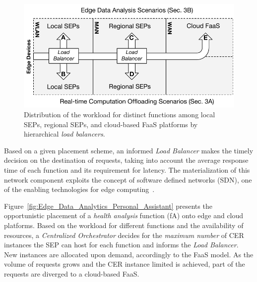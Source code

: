 
\begin{figure}[b]
	\centering
	\includegraphics[width=1\linewidth]{Figs/Edge_Load_Placement}
	\caption{Distribution of the workload for distinct functions among local SEPs, regional SEPs, and cloud-based FaaS platforms by hierarchical \textit{load balancers}.}
	\label{fig:Edge_Load_Placement}
\end{figure}


Based on a given placement scheme, an informed \textit{Load Balancer} makes the timely decision on the destination of requests, taking into account the average response time of each function and its requirement for latency.
The materialization of this network component exploits the concept of software defined networks (SDN), one of the enabling technologies for edge computing~\cite{Mach:2017}. 





Figure~\ref{fig:Edge_Data_Analytics_Personal_Assistant} presents the opportunistic placement of a \textit{health analysis} function (fA) onto edge and cloud platforms. Based on the workload for different functions and the availability of resources, a \textit{Centralized Orchestrator} decides for the \textit{maximum number} of CER instances the SEP can host for each function and informs the \textit{Load Balancer}. New instances are allocated upon demand, accordingly to the FaaS model. As the volume of requests grows and the CER instance limited is achieved, part of the requests are diverged to a cloud-based FaaS.

